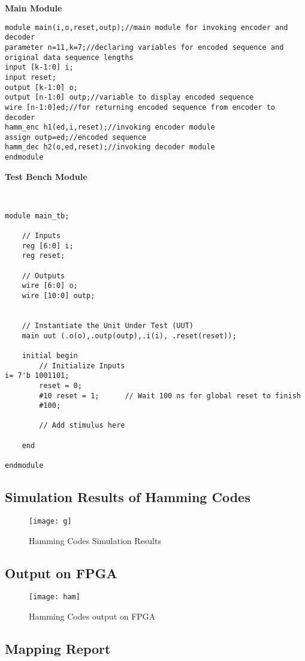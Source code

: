 \documentclass[14pt]{report}
\begin{document}
{\begin{verbatim}
\end{verbatim}
\textbf{Main Module}\\
\begin{verbatim}
module main(i,o,reset,outp);//main module for invoking encoder and decoder
parameter n=11,k=7;//declaring variables for encoded sequence and original data sequence lengths
input [k-1:0] i;
input reset;
output [k-1:0] o;
output [n-1:0] outp;//variable to display encoded sequence
wire [n-1:0]ed;//for returning encoded sequence from encoder to decoder
hamm_enc h1(ed,i,reset);//invoking encoder module
assign outp=ed;//encoded sequence
hamm_dec h2(o,ed,reset);//invoking decoder module
endmodule

\end{verbatim}
\textbf{Test Bench Module}
\begin{verbatim}


module main_tb;

	// Inputs
	reg [6:0] i;
	reg reset;

	// Outputs
	wire [6:0] o;
	wire [10:0] outp;
	

	// Instantiate the Unit Under Test (UUT)
	main uut (.o(o),.outp(outp),.i(i), .reset(reset));

	initial begin
		// Initialize Inputs
i= 7'b 1001101;
		reset = 0;
		#10 reset = 1;		// Wait 100 ns for global reset to finish
		#100;
        
		// Add stimulus here

	end
      
endmodule

\end{verbatim}
\subsection{Simulation Results of Hamming Codes}
\begin{figure}[ht]
\centering
\texttt{[image: g]}
\caption{Hamming Codes Simulation Results}
\end{figure}
\subsection*{Output on FPGA}
\begin{figure}[ht]
\centering
\texttt{[image: ham]}
\caption{Hamming Codes output on FPGA}
\end{figure}
\subsection*{Mapping Report}

}
\end{document}
